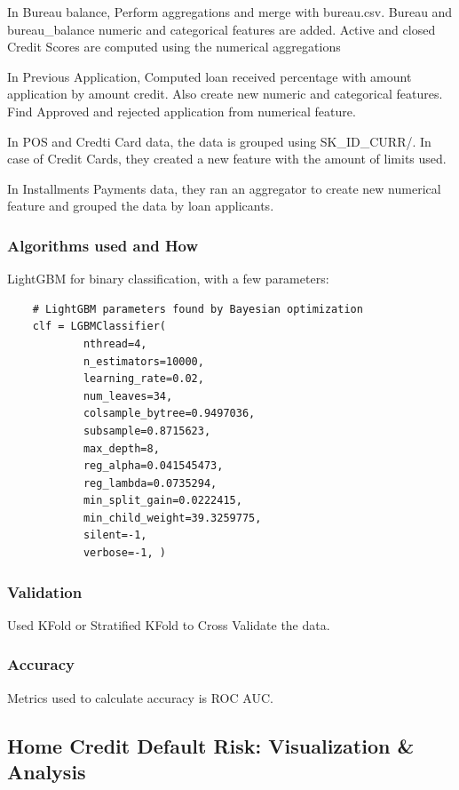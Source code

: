 \documentclass[twoside,a4paper]{article}
\begin{document}
In Bureau balance, Perform aggregations and merge with bureau.csv. Bureau and bureau\_balance numeric and categorical features are added. Active and closed Credit Scores are computed using the numerical aggregations

In Previous Application, Computed loan received percentage with amount application by amount credit. Also create new numeric and categorical features. Find Approved and rejected application from numerical feature.

In POS and Credti Card data, the data is grouped using SK\_ID\_CURR/. In case of Credit Cards, they created a new feature with the amount of limits used.

In Installments Payments data, they ran an aggregator to create new numerical feature and grouped the data by loan applicants.

\subsubsection{Algorithms used and How}
LightGBM for binary classification, with a few parameters:
\begin{lstlisting}
    # LightGBM parameters found by Bayesian optimization
    clf = LGBMClassifier(
            nthread=4,
            n_estimators=10000,
            learning_rate=0.02,
            num_leaves=34,
            colsample_bytree=0.9497036,
            subsample=0.8715623,
            max_depth=8,
            reg_alpha=0.041545473,
            reg_lambda=0.0735294,
            min_split_gain=0.0222415,
            min_child_weight=39.3259775,
            silent=-1,
            verbose=-1, )
\end{lstlisting}

\subsubsection{Validation}
Used KFold or Stratified KFold to Cross Validate the data.

\subsubsection{Accuracy}
Metrics used to calculate accuracy is ROC AUC.

\subsection{Home Credit Default Risk: Visualization \& Analysis}
\end{document}
